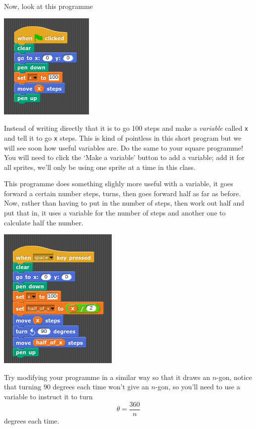 \documentclass[11pt,a4paper]{scrartcl}
\begin{document}
Now, look at this programme
\begin{center}
\includegraphics{variable.png}
\end{center}
Instead of writing directly that it is to go 100 steps and make a
\textsl{variable} called \texttt{x} and tell it to go \texttt{x}
steps. This is kind of pointless in this short program but we will see
soon how useful variables are. Do the same to your square programme!
You will need to click the \lq{}Make a variable\rq{} button to add a
variable; add it for all sprites, we'll only be using one sprite at a
time in this class.

This programme does something slighly more useful with a variable, it
goes forward a certain number steps, turns, then goes forward half as
far as before. Now, rather than having to put in the number of steps,
then work out half and put that in, it uses a variable for the number
of steps and another one to calculate half the number. 
\begin{center}
\includegraphics{line_half_line.png}
\end{center}
Try modifying your programme in a similar way so that it draws an
$n$-gon, notice that turning 90 degrees each time won't give an
$n$-gon, so you'll need to use a variable to instruct it to turn
\begin{equation}
\theta=\frac{360}{n}
\end{equation}
degrees each time.
\end{document}
